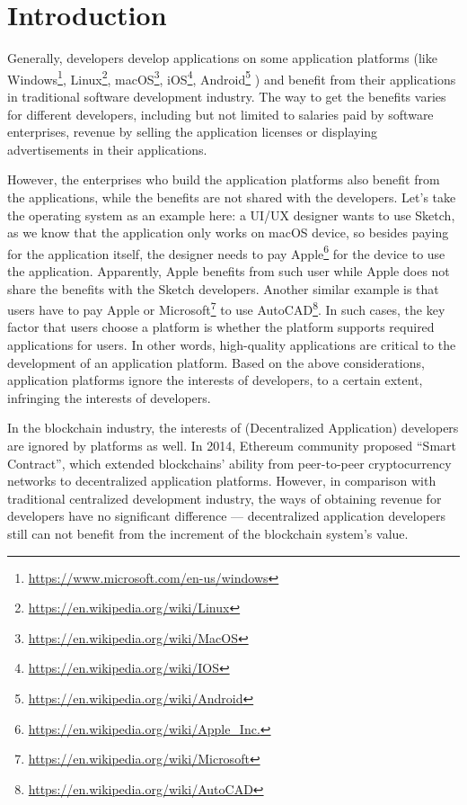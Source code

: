 \section{Introduction}
\noindent
Generally, developers develop applications on some application platforms (like
Windows\footnote{\url{https://www.microsoft.com/en-us/windows}}, Linux\footnote{\url{https://en.wikipedia.org/wiki/Linux}},
macOS\footnote{\url{https://en.wikipedia.org/wiki/MacOS}},
iOS\footnote{\url{https://en.wikipedia.org/wiki/IOS}},
Android\footnote{\url{https://en.wikipedia.org/wiki/Android}} \etc) and
benefit from their applications in traditional software development industry.
The way to get the benefits varies for different developers, including but not
limited to salaries paid by software enterprises, revenue by selling the
application licenses or displaying advertisements in their applications.

However, the enterprises who build the application platforms also benefit
from the applications, while the benefits are not shared with the developers.
Let's take the operating system as an example here: a UI/UX designer wants to use Sketch,
as we know that the application only works on {macOS} device, so besides
paying for the application itself, the designer needs to pay Apple\footnote{\url{https://en.wikipedia.org/wiki/Apple_Inc.}}
for the device  to use the application. Apparently, Apple benefits from such user while
Apple does not share the benefits with the Sketch developers.
Another similar example is that users have to pay Apple or
Microsoft\footnote{\url{https://en.wikipedia.org/wiki/Microsoft}} to use
AutoCAD\footnote{\url{https://en.wikipedia.org/wiki/AutoCAD}}. In such cases,
the key factor that users choose a platform is whether the platform
supports required applications for users. In other words, high-quality
applications are critical to the development of an application platform. Based on the above considerations,  application platforms ignore the interests of developers, to a certain extent, infringing the interests of developers.

In the blockchain industry, the interests of \dapp(Decentralized Application) developers are ignored by platforms  as  well.
 In 2014, Ethereum community proposed ``Smart Contract'',
which extended blockchains' ability from peer-to-peer
cryptocurrency networks to decentralized application platforms. However, in comparison with traditional centralized development industry, the ways of obtaining revenue for developers have no significant difference --- decentralized application developers still can not benefit
 from the increment of the blockchain system's value.


